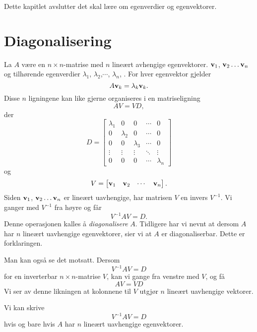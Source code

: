 

\label{ch:diagonalisering}
Dette kapitlet avslutter det skal lære om egenverdier og egenvektorer.


\section*{Diagonalisering}
La $A$ være en  $n \times n$-matrise med $n$ lineært avhengige egenvektorer.
$\mathbf{v}_1$, $\mathbf{v}_2\dots \mathbf{v}_n$ 
og tilhørende egenverdier $\lambda_1$, $\lambda_2$,$\cdots$, $\lambda_n$, . 
For hver egenvektor gjelder
\[
A\mathbf{v}_k=\lambda_k \mathbf{v}_k.
\]
Disse $n$ ligningene kan like gjerne organiseres i en matriseligning
\[
AV=VD, 
\]
der 
\[
D=
\begin{bmatrix}
\lambda_1      & 0      & 0      & \cdots & 0 \\
0      & \lambda_2      & 0      & \cdots & 0 \\
0      & 0      & \lambda_3      & \cdots & 0 \\
\vdots & \vdots & \vdots & \ddots & \vdots \\
0      & 0      & 0      & \cdots & \lambda_n
\end{bmatrix}
\]
og 
\[
V=
\begin{bmatrix}
\mathbf{v}_1 & \mathbf{v}_2 & \cdots & \mathbf{v}_n
\end{bmatrix}.
\]
Siden $\mathbf{v}_1$, $\mathbf{v}_2\dots \mathbf{v}_n$ er lineært uavhengige, har matrisen $V$  en invers $V^{-1}$. Vi ganger med $V^{-1}$ fra høyre og får
\[
V^{-1}AV=D.
\]
Denne operasjonen kalles å \emph{diagonalisere} $A$. Tidligere har vi nevnt at dersom $A$ har $n$ lineært uavhengige egenvektorer, sier vi at $A$ er diagonaliserbar. Dette er forklaringen.

Man kan også se det motsatt. Dersom 
\[
V^{-1}AV=D
\]
for en inverterbar $n \times n$-matrise $V$, kan vi gange fra venstre med $V$, og få
\[
AV=VD
\]
Vi ser av denne likningen at kolonnene til $V$ utgjør $n$ lineært uavhengige vektorer.

\begin{thm}
Vi kan skrive 
\[
V^{-1}AV=D
\]
hvis og bare hvis $A$ har $n$ lineært uavhengige egenvektorer.
\end{thm}

